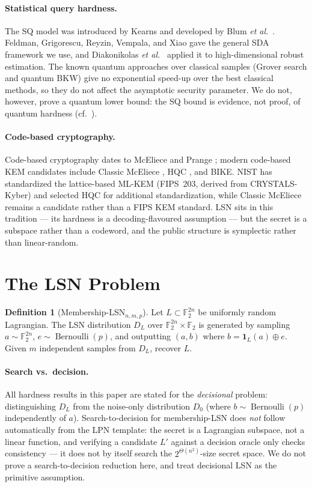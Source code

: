 \documentclass[11pt,a4paper]{article}
\theoremstyle{plain}
\theoremstyle{definition}
\newtheorem{definition}[theorem]{Definition}
\newcommand{\F}{\mathbb{F}}
\newcommand{\etal}{\textit{et al.}}
\begin{document}
\paragraph{Statistical query hardness.}
The SQ model was introduced by Kearns \cite{Kea98} and developed by Blum \etal\ \cite{BFJ+94}. Feldman, Grigorescu, Reyzin, Vempala, and Xiao \cite{FGR+17} gave the general SDA framework we use, and Diakonikolas \etal\ \cite{DKS17} applied it to high-dimensional robust estimation. The known quantum approaches over classical samples (Grover search and quantum BKW) give no exponential speed-up over the best classical methods, so they do not affect the asymptotic security parameter. We do not, however, prove a quantum lower bound: the SQ bound is evidence, not proof, of quantum hardness (cf.\ ).

\paragraph{Code-based cryptography.}
Code-based cryptography dates to McEliece \cite{McE78} and Prange \cite{Pra62}; modern code-based KEM candidates include Classic McEliece \cite{ABD+21}, HQC \cite{AAC+22}, and BIKE. NIST has standardized the lattice-based ML-KEM (FIPS~203, derived from CRYSTALS-Kyber) and selected HQC for additional standardization, while Classic McEliece remains a candidate rather than a FIPS KEM standard. LSN sits in this tradition --- its hardness is a decoding-flavoured assumption --- but the secret is a subspace rather than a codeword, and the public structure is symplectic rather than linear-random.

\section{The LSN Problem}
\label{sec:lsn-problem}

\begin{definition}[Membership-LSN$_{n,m,p}$]
\label{def:lsn}
Let $L \subset \F_2^{2n}$ be uniformly random Lagrangian. The LSN distribution $D_L$ over $\F_2^{2n} \times \F_2$ is generated by sampling $a \sim \F_2^{2n}$, $e \sim \operatorname{Bernoulli}(p)$, and outputting $(a, b)$ where $b = \mathbf{1}_L(a) \oplus e$. Given $m$ independent samples from $D_L$, recover $L$.
\end{definition}

\paragraph{Search vs.~decision.} All hardness results in this paper are stated for the \emph{decisional} problem: distinguishing $D_L$ from the noise-only distribution $D_0$ (where $b \sim \operatorname{Bernoulli}(p)$ independently of $a$). Search-to-decision for membership-LSN does \emph{not} follow automatically from the LPN template: the secret is a Lagrangian subspace, not a linear function, and verifying a candidate $L'$ against a decision oracle only checks consistency --- it does not by itself search the $2^{\Theta(n^2)}$-size secret space. We do not prove a search-to-decision reduction here, and treat decisional LSN as the primitive assumption.
\end{document}
